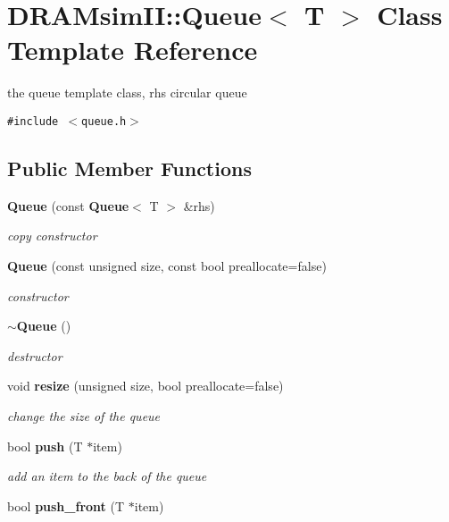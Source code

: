 \section{DRAMsimII::Queue$<$ T $>$ Class Template Reference}
\label{class_d_r_a_msim_i_i_1_1_queue}
the queue template class, rhs circular queue  


{\tt \#include $<$queue.h$>$}

\subsection*{Public Member Functions}
\begin{CompactItemize}
\item 
{\bf Queue} (const {\bf Queue}$<$ T $>$ \&rhs)
\begin{CompactList}\small\item\em copy constructor \item\end{CompactList}\item 
{\bf Queue} (const unsigned size, const bool preallocate=false)
\begin{CompactList}\small\item\em constructor \item\end{CompactList}\item 
{\bf $\sim$Queue} ()
\begin{CompactList}\small\item\em destructor \item\end{CompactList}\item 
void {\bf resize} (unsigned size, bool preallocate=false)
\begin{CompactList}\small\item\em change the size of the queue \item\end{CompactList}\item 
bool {\bf push} (T $\ast$item)
\begin{CompactList}\small\item\em add an item to the back of the queue \item\end{CompactList}\item 
bool {\bf push\_\-front} (T $\ast$item)\label{class_d_r_a_msim_i_i_1_1_queue_b115d3b196706625ccd45f536acf3c9f}


\end{CompactItemize}
